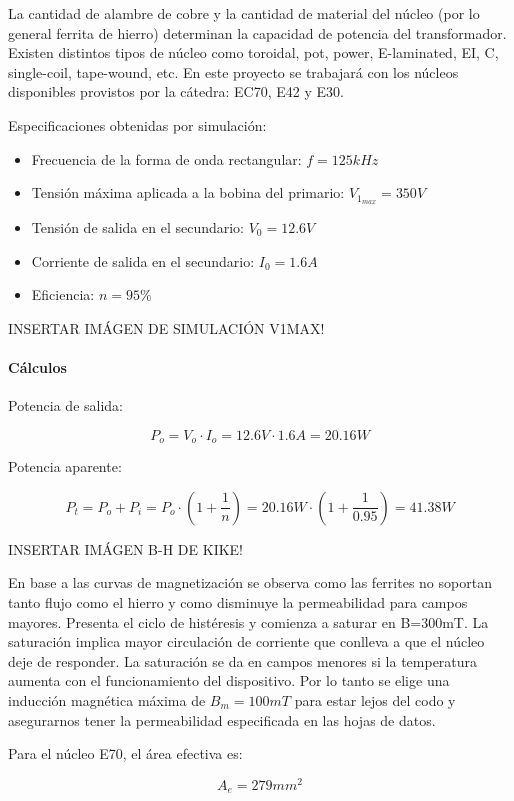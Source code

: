 La cantidad de alambre de cobre y la cantidad de material del núcleo (por lo general ferrita de hierro) determinan la capacidad de potencia del transformador. 
Existen distintos tipos de núcleo como toroidal, pot, power, E-laminated, EI, C, single-coil, tape-wound, etc. 
En este proyecto se trabajará con los núcleos disponibles provistos por la cátedra: EC70, E42 y E30. 

Especificaciones obtenidas por simulación:
\begin{itemize}
    \item Frecuencia de la forma de onda rectangular: $f=125kHz$
    \item Tensión máxima aplicada a la bobina del primario: $V_{1_{max}}=350V$
    \item Tensión de salida en el secundario: $V_{0}=12.6V$
    \item Corriente de salida en el secundario: $I_{0}=1.6A$
    \item Eficiencia: $n=95\%$
\end{itemize}

INSERTAR IMÁGEN DE SIMULACIÓN V1MAX!

\paragraph{Cálculos}

Potencia de salida:

$$ P_{o}=V_{o}\cdot I_{o}=12.6V\cdot 1.6A=20.16W $$

Potencia aparente: 

$$P_t=P_o+P_i=P_o\cdot\left(1+\frac{1}{n}\right)=20.16W\cdot\left(1+\frac{1}{0.95}\right)=41.38W  $$

INSERTAR IMÁGEN B-H DE KIKE!

En base a las curvas de magnetización se observa como las ferrites no soportan tanto flujo como el hierro y como disminuye la permeabilidad para campos mayores.  
Presenta el ciclo de histéresis y comienza a saturar en B=300mT. 
La saturación implica mayor circulación de corriente que conlleva a que el núcleo deje de responder. 
La saturación se da en campos menores si la temperatura aumenta con el funcionamiento del dispositivo. 
Por lo tanto se elige una inducción magnética máxima de $B_{m}=100mT$ para estar lejos del codo y asegurarnos tener la permeabilidad especificada en las hojas de datos. 

Para el núcleo E70, el área efectiva es: 

$$ A_{e}=279{mm}^{2} $$

